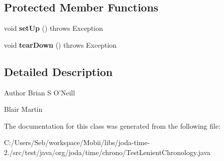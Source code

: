 \subsection*{Protected Member Functions}
\begin{DoxyCompactItemize}
\item 
\hypertarget{classorg_1_1joda_1_1time_1_1chrono_1_1_test_lenient_chronology_acb98aa9aea37405493197a685709a457}{void {\bfseries set\-Up} ()  throws Exception }\label{classorg_1_1joda_1_1time_1_1chrono_1_1_test_lenient_chronology_acb98aa9aea37405493197a685709a457}

\item 
\hypertarget{classorg_1_1joda_1_1time_1_1chrono_1_1_test_lenient_chronology_af022c2228ab9e5aa40f73fe3586b0b46}{void {\bfseries tear\-Down} ()  throws Exception }\label{classorg_1_1joda_1_1time_1_1chrono_1_1_test_lenient_chronology_af022c2228ab9e5aa40f73fe3586b0b46}

\end{DoxyCompactItemize}


\subsection{Detailed Description}
\begin{DoxyAuthor}{Author}
Brian S O'Neill 

Blair Martin 
\end{DoxyAuthor}


The documentation for this class was generated from the following file\-:\begin{DoxyCompactItemize}
\item 
C\-:/\-Users/\-Seb/workspace/\-Mobii/libs/joda-\/time-\/2./src/test/java/org/joda/time/chrono/Test\-Lenient\-Chronology.\-java\end{DoxyCompactItemize}
